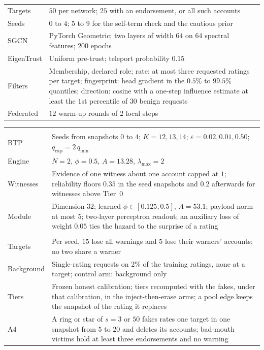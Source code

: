 \documentclass[lettersize,journal]{IEEEtran}
\begin{document}
\begin{table}[!t]
\begin{tabular}[t]{@{}>{\raggedright\arraybackslash}p{}>{\raggedright\arraybackslash}p{}@{}}
Targets & $50$ per network; $25$ with an endorsement, or all such accounts \\
Seeds & $0$ to $4$; $5$ to $9$ for the self-term check and the cautious prior \\
SGCN & PyTorch Geometric; two layers of width $64$ on $64$ spectral features; $200$ epochs \\
EigenTrust & Uniform pre-trust; teleport probability $0.15$ \\
Filters & Membership, declared role; rate: at most three requested ratings per target; fingerprint: head gradient in the $0.5\%$ to $99.5\%$ quantiles; direction: cosine with a one-step influence estimate at least the $1$st percentile of $30$ benign requests \\
Federated & $12$ warm-up rounds of $2$ local steps \\
\bottomrule
\end{tabular}\hfill
\begin{tabular}[t]{@{}>{\raggedright\arraybackslash}p{}>{\raggedright\arraybackslash}p{}@{}}
\toprule
\multicolumn{2}{@{}l}{\textbf{KEEPER}} \\[1pt]
BTP & Seeds from snapshots $0$ to $4$; $K = 12, 13, 14$; $\varepsilon = 0.02, 0.01, 0.50$; $q_{\mathrm{cap}} = 2\,q_{\min}$ \\
Engine & $N = 2$, $\phi = 0.5$, $A = 13.28$, $\lambda_{\max} = 2$ \\
Witnesses & Evidence of one witness about one account capped at $1$; reliability floors $0.35$ in the seed snapshots and $0.2$ afterwards for witnesses above Tier~$0$ \\
Module & Dimension $32$; learned $\phi \in [0.125, 0.5]$, $A = 53.1$; payload norm at most $5$; two-layer perceptron readout; an auxiliary loss of weight $0.05$ ties the hazard to the surprise of a rating \\
\midrule
\multicolumn{2}{@{}l}{\textbf{Retention and attack runs}} \\[1pt]
Targets & Per seed, $15$ lose all warnings and $5$ lose their warners' accounts; no two share a warner \\
Background & Single-rating requests on $2\%$ of the training ratings, none at a target; control arm: background only \\
Tiers & Frozen honest calibration; tiers recomputed with the fakes, under that calibration, in the inject-then-erase arms; a pool edge keeps the snapshot of the rating it replaces \\
A4 & A ring or star of $s = 3$ or $50$ fakes rates one target in one snapshot from $5$ to $20$ and deletes its accounts; bad-mouth victims hold at least three endorsements and no warning \\

\end{tabular}
\end{table}
\end{document}
